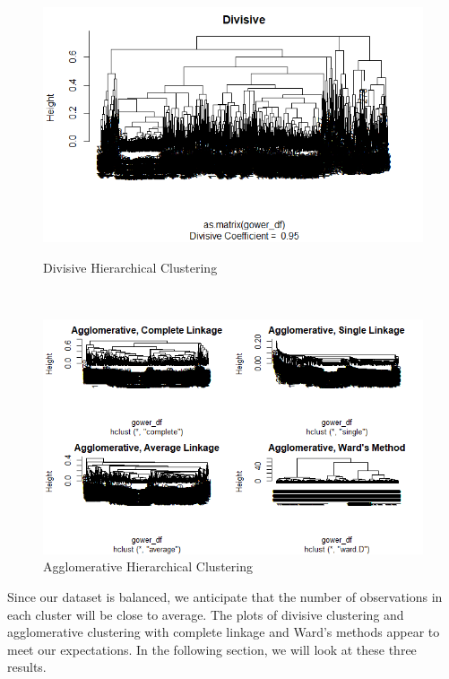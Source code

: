 \begin{figure}[!htb]
   \begin{minipage}{1\textwidth}
     \centering
     \includegraphics[width=1\linewidth]{image/hir_div.png}
     \caption{Divisive Hierarchical Clustering}\label{hir_div}
   \end{minipage}\hfill
   \\
   \begin{minipage}{1\textwidth}
     \centering
     \includegraphics[width=1\linewidth]{image/hir_agg.png}
     \caption{Agglomerative Hierarchical Clustering}\label{hir_agg}
   \end{minipage}
\end{figure}

Since our dataset is balanced, we anticipate that the number of observations in each cluster will be close to average. The plots of divisive clustering and agglomerative clustering with complete linkage and Ward's methods appear to meet our expectations. In the following section, we will look at these three results.

